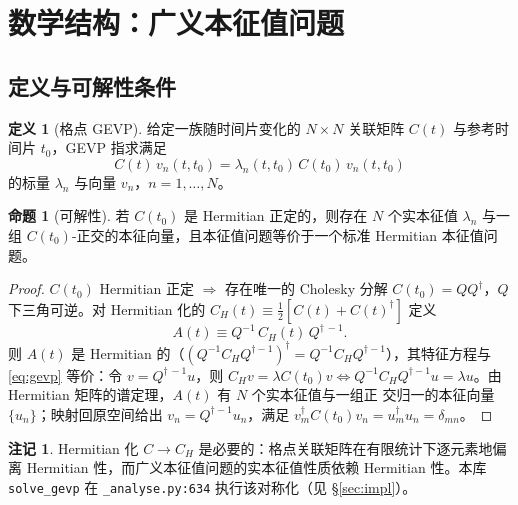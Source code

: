 \documentclass[12pt,a4paper]{ctexart}
\theoremstyle{definition}
\newtheorem{definition}{定义}[section]
\newtheorem{proposition}{命题}[section]
\newtheorem{remark}{注记}[section]
\newcommand{\dagg}{\dagger}
\newcommand{\code}[1]{\texttt{#1}}
\begin{document}
\section{数学结构：广义本征值问题}\label{sec:math}

\subsection{定义与可解性条件}

\begin{definition}[格点 GEVP]\label{def:gevp}
给定一族随时间片变化的 $N\times N$ 关联矩阵 $C(t)$ 与参考时间片 $t_0$，GEVP 指求满足
\begin{equation}
\boxed{\;C(t)\,v_n(t,t_0) = \lambda_n(t,t_0)\, C(t_0)\, v_n(t,t_0)\;}
\label{eq:gevp}
\end{equation}
的标量 $\lambda_n$ 与向量 $v_n$，$n=1,\dots,N$。
\end{definition}

\begin{proposition}[可解性]\label{prop:existence}
若 $C(t_0)$ 是 Hermitian 正定的，则存在 $N$ 个实本征值 $\lambda_n$ 与一组 $C(t_0)$-正交的本征向量，且本征值问题等价于一个标准 Hermitian 本征值问题。
\end{proposition}

\begin{proof}
$C(t_0)$ Hermitian 正定 $\Rightarrow$ 存在唯一的 Cholesky 分解 $C(t_0) = Q Q^\dagg$，$Q$ 下三角可逆。对 Hermitian 化的 $C_H(t)\equiv\frac{1}{2}[C(t)+C(t)^\dagg]$ 定义
\begin{equation}
A(t) \equiv Q^{-1}\, C_H(t)\, Q^{\dagg\,-1}.
\label{eq:whitened}
\end{equation}
则 $A(t)$ 是 Hermitian 的（$(Q^{-1}C_HQ^{\dagg-1})^\dagg = Q^{-1}C_H Q^{\dagg-1}$），其特征方程与 \eqref{eq:gevp} 等价：令 $v = Q^{\dagg\,-1}u$，则 $C_H v = \lambda C(t_0) v \iff Q^{-1}C_HQ^{\dagg-1}u = \lambda u$。由 Hermitian 矩阵的谱定理，$A(t)$ 有 $N$ 个实本征值与一组正 交归一的本征向量 $\{u_n\}$；映射回原空间给出 $v_n = Q^{\dagg-1}u_n$，满足 $v_m^\dagg C(t_0) v_n = u_m^\dagg u_n = \delta_{mn}$。
\end{proof}

\begin{remark}
Hermitian 化 $C\to C_H$ 是必要的：格点关联矩阵在有限统计下逐元素地偏离 Hermitian 性，而广义本征值问题的实本征值性质依赖 Hermitian 性。本库 \code{solve\_gevp} 在 \code{\_analyse.py:634} 执行该对称化（见 §\ref{sec:impl}）。
\end{remark}
\end{document}

